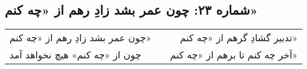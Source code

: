 \begin{center}
\section*{شماره ۲۳: چون عمر بشد زادِ رهم از «چه کنم»}
\label{sec:023}
\begin{longtable}{l p{0.5cm} r}
چون عمر بشد زادِ رهم از «چه کنم»
&&
تدبیر گشادِ گرهم از «چه کنم»
\\
چون از «چه کنم» هیچ نخواهد آمد
&&
آخر چه کنم تا برهم از «چه کنم»
\\
\end{longtable}
\end{center}
